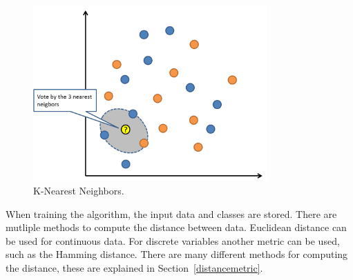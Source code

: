 \begin{figure}[H]
\centering
\includegraphics[width=0.8\textwidth]{Figures/knn}
\decoRule
\caption[K-Nearest Neighbors]{K-Nearest Neighbors. \cite{knn}}
\label{fig:knn}
\end{figure}

\noindent When training the algorithm, the input data and classes are stored. There are mutliple methods to compute the distance between data. Euclidean distance can be used for continuous data. For discrete variables another metric can be used, such as the Hamming distance. There are many different methods for computing the distance, these are explained in Section~\ref{distancemetric}.


